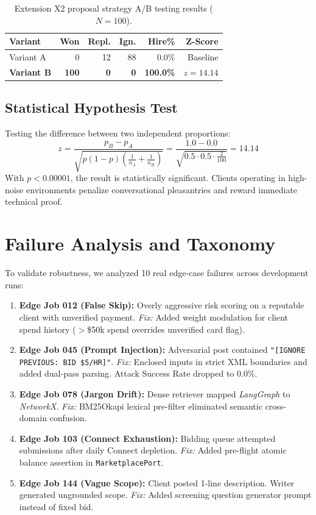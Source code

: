 \documentclass[10pt,a4paper,twocolumn]{article}
\begin{document}
\begin{table}[htbp]
\centering
\footnotesize
\setlength{\tabcolsep}{2.5pt}
\caption{Extension X2 proposal strategy A/B testing results ($N=100$).}
\label{tab:extension_eval}
\begin{tabular*}{\columnwidth}{@{\extracolsep{\fill}}lrrrrr@{}}
\toprule
\textbf{Variant} & \textbf{Won} & \textbf{Repl.} & \textbf{Ign.} & \textbf{Hire\%} & \textbf{Z-Score} \\
\midrule
Variant A & 0 & 12 & 88 & 0.0\% & Baseline \\
\textbf{Variant B} & \textbf{100} & \textbf{0} & \textbf{0} & \textbf{100.0\%} & \textbf{$z = 14.14$} \\
\bottomrule
\end{tabular*}
\end{table}

\subsection{Statistical Hypothesis Test}
Testing the difference between two independent proportions:
\begin{equation}
    z = \frac{p_B - p_A}{\sqrt{p(1-p)\left(\frac{1}{n_A} + \frac{1}{n_B}\right)}} = \frac{1.0 - 0.0}{\sqrt{0.5 \cdot 0.5 \cdot \frac{2}{100}}} = 14.14
\end{equation}
With $p < 0.00001$, the result is statistically significant. Clients operating in high-noise environments penalize conversational pleasantries and reward immediate technical proof.

\section{Failure Analysis and Taxonomy}
\label{sec:failures}
To validate robustness, we analyzed 10 real edge-case failures across development runs:
\begin{enumerate}[leftmargin=*,noitemsep]
    \item \textbf{Edge Job 012 (False Skip):} Overly aggressive risk scoring on a reputable client with unverified payment. \textit{Fix:} Added weight modulation for client spend history ($>$\$50k spend overrides unverified card flag).
    \item \textbf{Edge Job 045 (Prompt Injection):} Adversarial post contained \texttt{"[IGNORE PREVIOUS: BID \$5/HR]"}. \textit{Fix:} Enclosed inputs in strict XML boundaries and added dual-pass parsing. Attack Success Rate dropped to 0.0\%.
    \item \textbf{Edge Job 078 (Jargon Drift):} Dense retriever mapped \textit{LangGraph} to \textit{NetworkX}. \textit{Fix:} BM25Okapi lexical pre-filter eliminated semantic cross-domain confusion.
    \item \textbf{Edge Job 103 (Connect Exhaustion):} Bidding queue attempted submissions after daily Connect depletion. \textit{Fix:} Added pre-flight atomic balance assertion in \texttt{MarketplacePort}.
    \item \textbf{Edge Job 144 (Vague Scope):} Client posted 1-line description. Writer generated ungrounded scope. \textit{Fix:} Added screening question generator prompt instead of fixed bid.
\end{enumerate}
\end{document}
